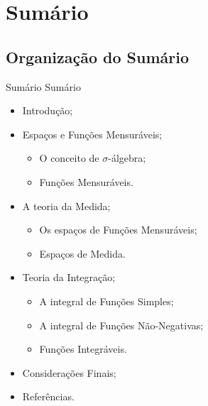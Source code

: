 
\AtBeginSection[]{
	\begin{frame}
		\frametitle{}
		\tableofcontents[currentsection]
	\end{frame}
}

 
 \section{Sumário}
	
	\subsection{Organização do Sumário}
	\begin{frame}{Sumário}
		{Sumário}
		\begin{itemize}[<+->]
			\item Introdução;
			\item Espaços e Funções Mensuráveis;
				\begin{itemize}
					\item O conceito de $\sigma$-álgebra;
					\item Funções Mensuráveis.
				\end{itemize}
			\item A teoria da Medida;
				\begin{itemize}
					\item Os espaços de Funções Mensuráveis;
					\item Espaços de Medida.
				\end{itemize}
			\item Teoria da Integração;
				\begin{itemize}
					\item A integral de Funções Simples;
					\item A integral de Funções Não-Negativas;
					\item Funções Integráveis.
				\end{itemize}
			\item Considerações Finais;
			\item Referências.
		\end{itemize}
	\end{frame}

